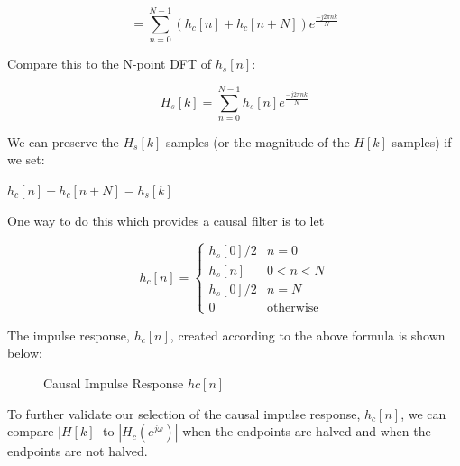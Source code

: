\documentclass[fleqn]{article}
\begin{document}
\begin{enumerate}
\begin{enumerate}[nolistsep]
			\begin{equation*}
				 = \sum_{n=0}^{N-1}{(h_c[n] + h_c[n+N])e^{\frac{-j2{\pi}nk}{N}}}
			\end{equation*}
			
			Compare this to the N-point DFT of $h_s[n]$:
			
			\begin{equation*}
				H_s[k] = \sum_{n=0}^{N-1}{h_s[n]e^{\frac{-j2{\pi}nk}{N}}}
			\end{equation*}
			
			We can preserve the $H_s[k]$ samples (or the magnitude of the $H[k]$ samples) if we set:
			
			$h_c[n] + h_c[n+N] = h_s[k]$
			
			One way to do this which provides a causal filter is to let
			
			\begin{equation*}
				h_c[n] = \begin{cases}
					h_s[0]/2 & n = 0\\
					h_s[n]   & 0 < n < N\\
					h_s[0]/2 & n = N\\
					0		 & \text{otherwise}
				\end{cases}
			\end{equation*}
			
			The impulse response, $h_c[n]$, created according to the above formula is shown below:
			
			\begin{figure}[H]
				\centerline{}
				\caption{Causal Impulse Response $hc[n]$}
			\end{figure}
			
			To further validate our selection of the causal impulse response, $h_c[n]$, we can compare $|H[k]|$ to $|H_c(e^{j\omega})|$ when the endpoints are halved and when the endpoints are not halved.
			

\end{enumerate}
\end{enumerate}
\end{document}
